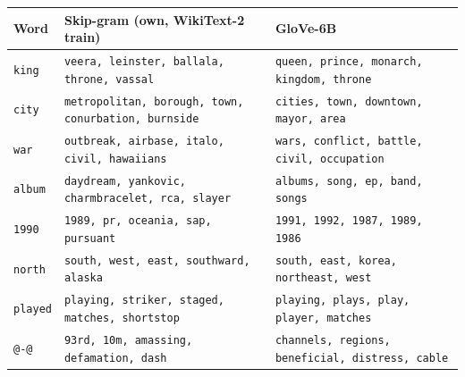 \begin{tabular}{@{}lp{6.2cm}p{6.2cm}@{}}
\toprule
Word & Skip-gram (own, WikiText-2 train) & GloVe-6B \\
\midrule
\texttt{king} & \texttt{veera, leinster, ballala, throne, vassal} & \texttt{queen, prince, monarch, kingdom, throne} \\
\texttt{city} & \texttt{metropolitan, borough, town, conurbation, burnside} & \texttt{cities, town, downtown, mayor, area} \\
\texttt{war} & \texttt{outbreak, airbase, italo, civil, hawaiians} & \texttt{wars, conflict, battle, civil, occupation} \\
\texttt{album} & \texttt{daydream, yankovic, charmbracelet, rca, slayer} & \texttt{albums, song, ep, band, songs} \\
\texttt{1990} & \texttt{1989, pr, oceania, sap, pursuant} & \texttt{1991, 1992, 1987, 1989, 1986} \\
\texttt{north} & \texttt{south, west, east, southward, alaska} & \texttt{south, east, korea, northeast, west} \\
\texttt{played} & \texttt{playing, striker, staged, matches, shortstop} & \texttt{playing, plays, play, player, matches} \\
\texttt{@-@} & \texttt{93rd, 10m, amassing, defamation, dash} & \texttt{channels, regions, beneficial, distress, cable} \\
\bottomrule
\end{tabular}